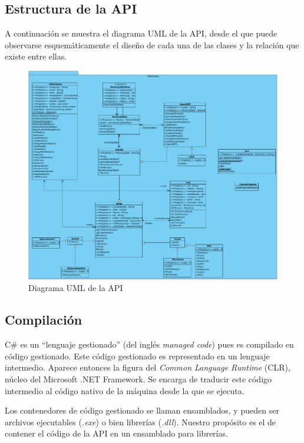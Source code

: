 \subsection{Estructura de la API}
A continuación se muestra el diagrama UML de la API, desde el que puede observarse esquemáticamente el diseño de cada una de las clases y la relación que existe entre ellas.

\begin{figure}[h]
  \centering
  \includegraphics[scale=0.4]{imagenes/diagrama_api2}
  \caption{Diagrama UML de la API}
  \label{fig:uml_api}
\end{figure}

\subsection{Compilación} \label{subsec:compilation}
C\# es un ``lenguaje gestionado'' (del inglés \textit{managed code}) pues es compilado en código gestionado. Este código gestionado es representado en un lenguaje intermedio. Aparece entonces la figura del \textit{Common Language Runtime} (CLR), núcleo del Microsoft .NET Framework. Se encarga de traducir este código intermedio al código nativo de la máquina desde la que se ejecuta.

Los contenedores de código gestionado se llaman ensamblados, y pueden ser archivos ejecutables (\textit{.exe}) o bien librerías (\textit{.dll})\cite{csnutshell}. Nuestro propósito es el de contener el código de la API en un ensamblado para librerías.

